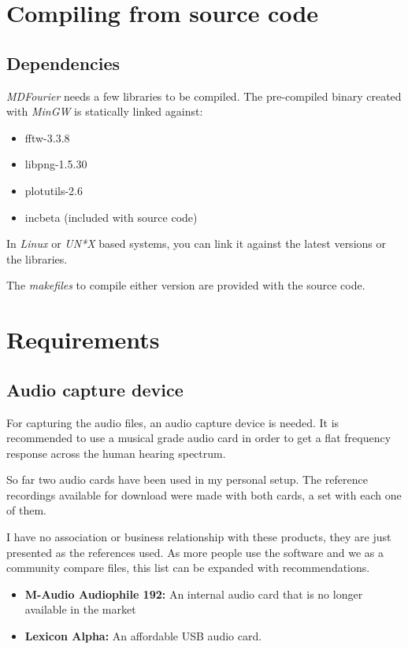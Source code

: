 \documentclass[10pt,a4paper]{report}
\begin{document}
\begin{appendices}
\chapter{Compiling from source code}

\section{Dependencies}

\textit{MDFourier} needs a few libraries to be compiled. The pre-compiled binary created with \textit{MinGW}\cite{mingw} is statically linked against:

\begin{itemize}
	\item fftw-3.3.8\cite{fftw}
	\item libpng-1.5.30\cite{libpng}
	\item plotutils-2.6\cite{libplot}
	\item incbeta\cite{betafunction} (included with source code)
\end{itemize}

In \textit{Linux} or \textit{UN*X} based systems, you can link it against the latest versions or the libraries.

The \textit{makefiles} to compile either version are provided with the source code\cite{sourcecode}.

\chapter{Requirements}
\label{requirements}
\section{Audio capture device}

For capturing the audio files, an audio capture device is needed. It is recommended to use a musical grade audio card in order to get a flat frequency response across the human hearing spectrum.

So far two audio cards have been used in my personal setup. The reference recordings available for download were made with both cards, a set with each one of them.

I have no association or business relationship with these products, they are just presented as the references used. As more people use the software and we as a community compare files, this list can be expanded with recommendations.

\begin{itemize}
	\item \textbf{M-Audio Audiophile 192:} An internal audio card that is no longer available in the market \cite{maudio}
	\item \textbf{Lexicon Alpha:} An affordable USB audio card. \cite{lexicon}
\end{itemize}


\end{appendices}
\end{document}
